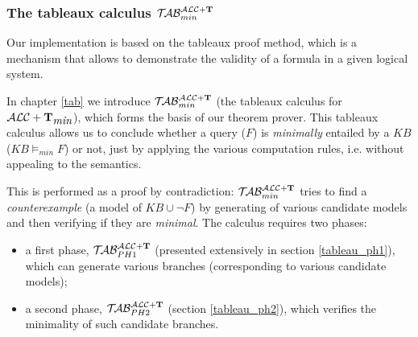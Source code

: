 \documentclass[a4paper, 11pt, oneside]{duthesis}
\newcommand{\tip}{{\bf T}}
\newcommand{\alctmin}{\mathcal{ALC}+\tip_{\mbox{\em min}}}
\newcommand{\nuovoc}{\mathrel{{\mathcal{T}\!\mathcal{AB}}}_{min}^{\mathcal{ALC}+\mbox{\scriptsize $\tip$}}}
\newcommand{\primo}{\mathrel{{\mathcal{T}\!\mathcal{AB}}}_{PH 1}^{\mathcal{ALC}+\mbox{\scriptsize $\tip$}}}
\newcommand{\secondo}{\mathrel{{\mathcal{T}\!\mathcal{AB}}}_{PH 2}^{\mathcal{ALC}+\mbox{\scriptsize $\tip$}}}
\begin{document}
%

%

\subsubsection{The tableaux calculus $\nuovoc$}

Our implementation is based on the tableaux proof method, which is a mechanism that allows to demonstrate the validity of a formula in a given logical system.

In chapter \ref{tab} we introduce $\nuovoc$ (the tableaux calculus for $\alctmin$), which forms the basis of our theorem prover. This tableaux calculus allows us to conclude whether a query ($F$) is \emph{minimally} entailed by a $KB$ ($KB \models_{min} F$) or not, just by applying the various computation rules, i.e. without appealing to the semantics.

This is performed as a proof by contradiction: $\nuovoc$ tries to find a \emph{counterexample} (a model of $KB \cup \neg F$) by generating of various candidate models and then verifying if they are \emph{minimal}.
The calculus requires two phases: 
\begin{itemize}
\item a first phase, $\primo$ (presented extensively in section \ref{tableau_ph1}), which can generate various branches (corresponding to various candidate models);
\item a second phase, $\secondo$ (section \ref{tableau_ph2}), which verifies the minimality of such candidate branches.
\end{itemize}
\end{document}
